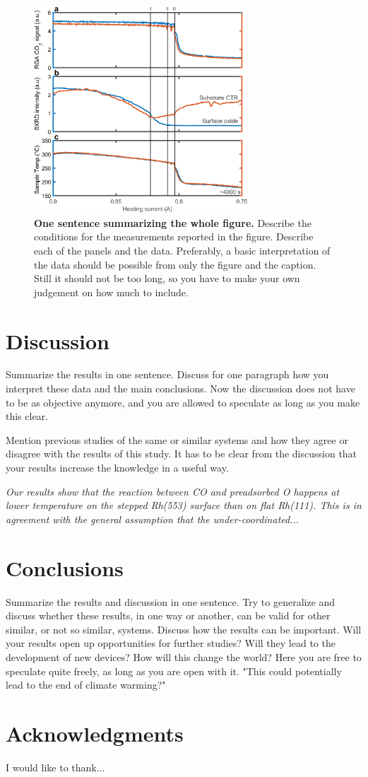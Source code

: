 \documentclass[aps,prl,groupedaddress,twocolumn]{revtex4-1}
\begin{document}
\begin{figure}
\includegraphics[width=8cm]{rh111-sxrd.eps}%
\caption{\label{} \textbf{One sentence summarizing the whole figure.}
Describe the conditions for the measurements reported in the figure. Describe each of the panels and the data. Preferably, a basic interpretation of the data should be possible from only the figure and the caption. Still it should not be too long, so you have to make your own judgement on how much to include.}
\end{figure}

\section{Discussion}
Summarize the results in one sentence. Discuss for one paragraph how you interpret these data and the main conclusions. Now the discussion does not have to be as objective anymore, and you are allowed to speculate as long as you make this clear.

Mention previous studies of the same or similar systems and how they agree or disagree with the results of this study. It has to be clear from the discussion that your results increase the knowledge in a useful way.

\textit{Our results show that the reaction between CO and preadsorbed O happens at lower temperature on the stepped Rh(553) surface than on flat Rh(111). This is in agreement with the general assumption that the under-coordinated...\cite{Lundgren_2008}}

\section{Conclusions}

Summarize the results and discussion in one sentence. Try to generalize and discuss whether these results, in one way or another, can be valid for other similar, or not so similar, systems.
Discuss how the results can be important. Will your results open up opportunities for further studies? Will they lead to the development of new devices? How will this change the world? Here you are free to speculate quite freely, as long as you are open with it. "This could potentially lead to the end of climate warming?"


\section{Acknowledgments}
I would like to thank...



\end{document}
